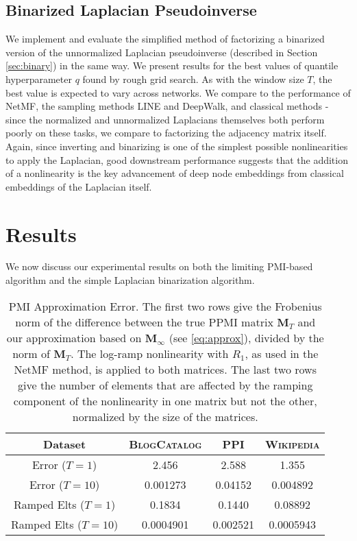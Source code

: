 \documentclass[sigconf]{acmart}
\newcommand{\bv}[1]{\mathbf{#1}}
\begin{document}
\subsection{Binarized Laplacian Pseudoinverse}
We implement and evaluate the simplified method of factorizing a binarized version of the unnormalized Laplacian pseudoinverse (described in Section \ref{sec:binary}) in the same way. We present results for the best values of quantile hyperparameter $q$ found by rough grid search. As with the window size $T$, the best value is expected to vary across networks. We compare to the performance of NetMF, the sampling methods LINE and DeepWalk, and classical methods - since the normalized and unnormalized Laplacians themselves both perform poorly on these tasks, we compare to factorizing the adjacency matrix itself. Again, since inverting and binarizing is one of the simplest possible nonlinearities to apply the Laplacian, good downstream performance suggests that the addition of a nonlinearity is the key advancement of deep node embeddings from classical embeddings of the Laplacian itself.

\section{Results}

We now discuss our experimental results  on both the limiting PMI-based algorithm and the simple Laplacian binarization algorithm.

\begin{table}
\begin{center}
\begin{tabular}{c|c|c|c}
\hline
\hline
Dataset   & \textsc{BlogCatalog} & \textsc{PPI}  & \textsc{Wikipedia} \\ \hline
Error ($T=1$)       & 2.456     & 2.588           & 1.355   \\ \hline
Error ($T=10$)       & 0.001273     & 0.04152           & 0.004892   \\ \hline
Ramped Elts ($T=1$) & 0.1834          & 0.1440                  & 0.08892        \\ \hline
Ramped Elts ($T=10$) & 0.0004901          & 0.002521                  & 0.0005943        \\ \hline
\hline
\end{tabular}
\end{center}
\smallskip
\caption{PMI Approximation Error. The first two rows give the Frobenius norm of the difference between the true PPMI matrix $\bv{M}_T$ and our approximation based on $\bv{M}_\infty$ (see \eqref{eq:approx}), divided by the norm of $\bv{M}_T$. The log-ramp nonlinearity with $R_1$, as used in the NetMF method, is applied to both matrices. The last two rows give the number of elements that are affected by the ramping component of the nonlinearity in one matrix but not the other, normalized by the size of the matrices.}
\label{approx_error_table}
\vspace{-2em}
\end{table}
\end{document}
